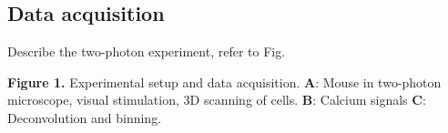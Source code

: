 \subsection{Data acquisition}
Describe the two-photon experiment, refer to Fig.

\textbf{Figure 1.}{
Experimental setup and data acquisition. 
\textbf{A}: Mouse in two-photon microscope, visual stimulation, 3D scanning of cells.
\textbf{B}: Calcium signals
\textbf{C}: Deconvolution and binning.
}\label{fig:01}
